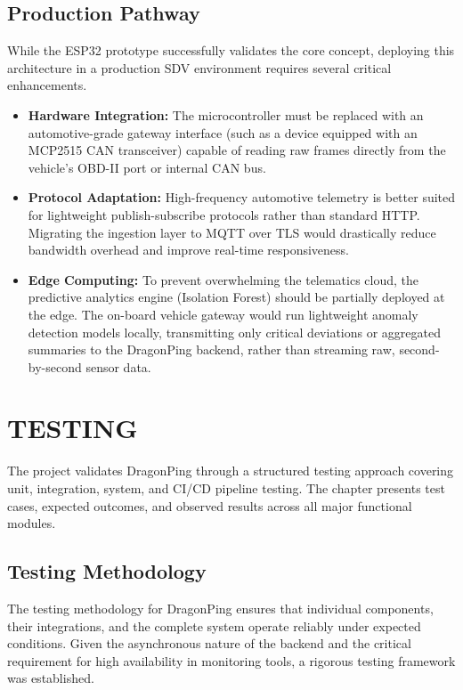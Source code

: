 \documentclass[12pt,a4paper,oneside]{report}
\begin{document}
\section{Production Pathway}
\noindent While the ESP32 prototype successfully validates the core concept, deploying this architecture in a production SDV environment requires several critical enhancements. 
\begin{itemize}[label=\textbullet, leftmargin=*]
    \item \textbf{Hardware Integration:} The microcontroller must be replaced with an automotive-grade gateway interface (such as a device equipped with an MCP2515 CAN transceiver) capable of reading raw frames directly from the vehicle's OBD-II port or internal CAN bus.
    \item \textbf{Protocol Adaptation:} High-frequency automotive telemetry is better suited for lightweight publish-subscribe protocols rather than standard HTTP. Migrating the ingestion layer to MQTT over TLS would drastically reduce bandwidth overhead and improve real-time responsiveness.
    \item \textbf{Edge Computing:} To prevent overwhelming the telematics cloud, the predictive analytics engine (Isolation Forest) should be partially deployed at the edge. The on-board vehicle gateway would run lightweight anomaly detection models locally, transmitting only critical deviations or aggregated summaries to the DragonPing backend, rather than streaming raw, second-by-second sensor data.
\end{itemize}

\chapter{TESTING}

The project validates DragonPing through a structured testing approach covering unit, integration, system, and CI/CD pipeline testing. The chapter presents test cases, expected outcomes, and observed results across all major functional modules.

\section{Testing Methodology}
\noindent The testing methodology for DragonPing ensures that individual components, their integrations, and the complete system operate reliably under expected conditions. Given the asynchronous nature of the backend and the critical requirement for high availability in monitoring tools, a rigorous testing framework was established. 
\end{document}
